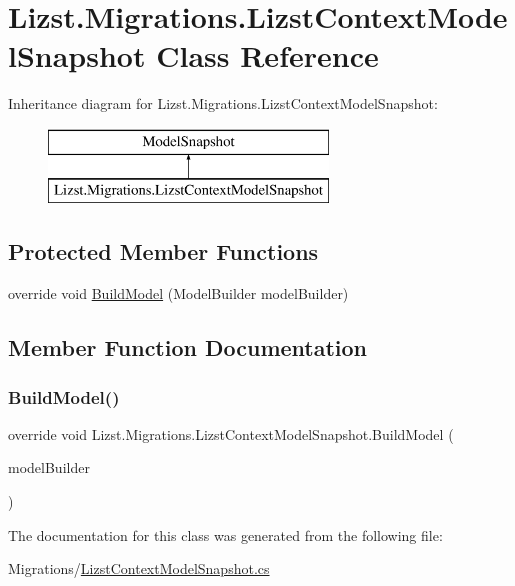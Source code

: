 \hypertarget{class_lizst_1_1_migrations_1_1_lizst_context_model_snapshot}{}\section{Lizst.\+Migrations.\+Lizst\+Context\+Model\+Snapshot Class Reference}
\label{class_lizst_1_1_migrations_1_1_lizst_context_model_snapshot}
Inheritance diagram for Lizst.\+Migrations.\+Lizst\+Context\+Model\+Snapshot\+:\begin{figure}[H]
\begin{center}
\leavevmode
\includegraphics[height=2.000000cm]{class_lizst_1_1_migrations_1_1_lizst_context_model_snapshot}
\end{center}
\end{figure}
\subsection*{Protected Member Functions}
\begin{DoxyCompactItemize}
\item 
override void \mbox{\hyperlink{class_lizst_1_1_migrations_1_1_lizst_context_model_snapshot_aa149ee8b5e31da555e5b0aae703cd5e9}{Build\+Model}} (Model\+Builder model\+Builder)
\end{DoxyCompactItemize}


\subsection{Member Function Documentation}
\mbox{\label{class_lizst_1_1_migrations_1_1_lizst_context_model_snapshot_aa149ee8b5e31da555e5b0aae703cd5e9}} 
\subsubsection{\texorpdfstring{BuildModel()}{BuildModel()}}
{\footnotesize\ttfamily override void Lizst.\+Migrations.\+Lizst\+Context\+Model\+Snapshot.\+Build\+Model (\begin{DoxyParamCaption}\item[{Model\+Builder}]{model\+Builder }\end{DoxyParamCaption})\hspace{0.3cm}{\ttfamily [protected]}}



The documentation for this class was generated from the following file\+:\begin{DoxyCompactItemize}
\item 
Migrations/\mbox{\hyperlink{_lizst_context_model_snapshot_8cs}{Lizst\+Context\+Model\+Snapshot.\+cs}}\end{DoxyCompactItemize}
